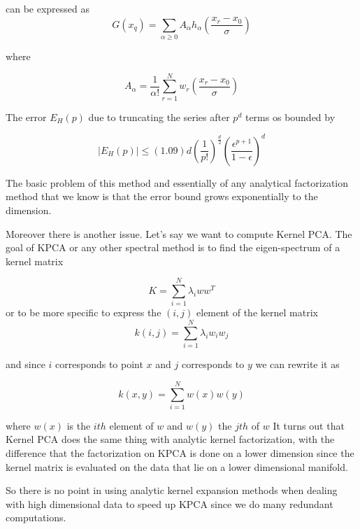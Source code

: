 \documentclass[12pt,letterpaper,doublespaced,ETD,dvips,proposal]{gtthesis}
\begin{document}
\begin{Body}
can be expressed as
\begin{equation}
  G(x_q)=\sum_{\alpha\geq 0} A_{\alpha} h_{\alpha}
  \left(\frac{x_r-x_0}{\sigma}\right)
\end{equation}

where

\begin{equation}
  A_{\alpha} = \frac{1}{\alpha!}
  \sum_{r=1}^{N}w_r\left(\frac{x_r-x_0}{\sigma}\right)
\end{equation}

The error $E_H(p)$ due to truncating the series after $p^d$ terms os
bounded by

\begin{equation}
|E_H(p)|\leq (1.09)d\left(\frac{1}{p!}\right)^{\frac{d}{2}}
\left(\frac{\epsilon^{p+1}}{1-\epsilon}\right)^d
\end{equation}

The basic problem of this method and essentially of any analytical
factorization method that we know is that the error bound grows
exponentially to the dimension.

Moreover there is another issue. Let's say we want to compute Kernel
PCA. The goal of KPCA or any other spectral method is to find the
eigen-spectrum of a kernel matrix

\begin{equation}
K = \sum_{i=1}^{N}\lambda_i ww^T
\end{equation}
or to be more specific to express the $(i, j)$ element of the kernel matrix
\begin{equation}
k(i,j)=\sum_{i=1}^{N}\lambda_i w_i w_j
\end{equation}

and since $i$ corresponds to point $x$ and $j$ corresponds to $y$
we can rewrite it as

\begin{equation}
k(x,y)=\sum_{i=1}^{N}w(x)w(y)
\end{equation}

where $w(x)$ is the $ith$ element of $w$ and $w(y)$ the $jth$ of $w$
It turns out that  Kernel PCA does the same thing with analytic
kernel factorization, with the difference that the factorization on
KPCA is done on a lower dimension since the kernel matrix is
evaluated on the data that lie on a lower dimensional manifold.

So there is no point in using analytic kernel expansion methods when
dealing with high dimensional data to speed up KPCA since we do many
redundant computations.



\end{Body}
\end{document}
